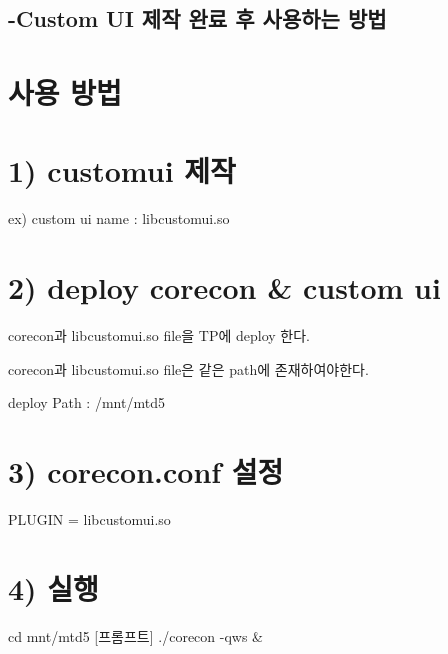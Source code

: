 \subsection*{-\/\-Custom U\-I 제작 완료 후 사용하는 방법}

\section*{사용 방법}

\section*{1) customui 제작}

\begin{DoxyVerb}    ex) custom ui name : libcustomui.so
\end{DoxyVerb}


\section*{2) deploy corecon \& custom ui}

\begin{DoxyVerb}    corecon과 libcustomui.so file을 TP에 deploy 한다.

    corecon과 libcustomui.so file은 같은 path에 존재하여야한다.

    deploy Path : /mnt/mtd5
\end{DoxyVerb}


\section*{3) corecon.\-conf 설정}

\begin{DoxyVerb}    PLUGIN = libcustomui.so
\end{DoxyVerb}


\section*{4) 실행}

\begin{DoxyVerb}    [프롬프트] cd mnt/mtd5
    [프롬프트] ./corecon -qws &\end{DoxyVerb}
 